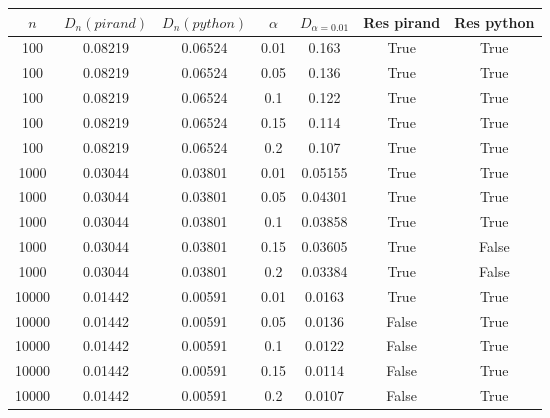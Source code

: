 \begin{tabular}{|c|c|c|c|c|c|c|}
\hline
 $n$ & $D_{n} (pirand)$ & $D_{n} (python)$ & $\alpha$ & $D_{\alpha = 0.01}$ & Res pirand & Res python\\ 
\hline 
100&0.08219&0.06524 & 0.01&0.163 & True & True\\\hline 
100&0.08219&0.06524 & 0.05&0.136 & True & True\\\hline 
100&0.08219&0.06524 & 0.1&0.122 & True & True\\\hline 
100&0.08219&0.06524 & 0.15&0.114 & True & True\\\hline 
100&0.08219&0.06524 & 0.2&0.107 & True & True\\\hline 
1000&0.03044&0.03801 & 0.01&0.05155 & True & True\\\hline 
1000&0.03044&0.03801 & 0.05&0.04301 & True & True\\\hline 
1000&0.03044&0.03801 & 0.1&0.03858 & True & True\\\hline 
1000&0.03044&0.03801 & 0.15&0.03605 & True & False\\\hline 
1000&0.03044&0.03801 & 0.2&0.03384 & True & False\\\hline 
10000&0.01442&0.00591 & 0.01&0.0163 & True & True\\\hline 
10000&0.01442&0.00591 & 0.05&0.0136 & False & True\\\hline 
10000&0.01442&0.00591 & 0.1&0.0122 & False & True\\\hline 
10000&0.01442&0.00591 & 0.15&0.0114 & False & True\\\hline 
10000&0.01442&0.00591 & 0.2&0.0107 & False & True\\\hline
\end{tabular}



